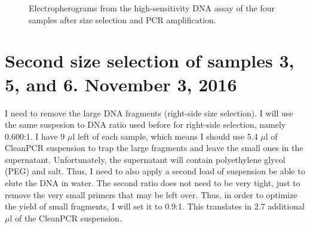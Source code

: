 \documentclass[a4paper,12pt]{article}
\begin{document}
\begin{figure}
\caption{Electropherograms from the high-sensitivity DNA assay of the four samples after size selection and PCR amplification.}\label{fig:sizeselection}
\end{figure}


\section{Second size selection of samples 3, 5, and 6. November 3, 2016}
I need to remove the large DNA fragments (right-side size selection). I will use the same suspesion to DNA ratio used before for right-side selection, namely 0.600:1. I have 9 $\mu$l left of each sample, which means I should use 5.4 $\mu$l of CleanPCR suspension to trap the large fragments and leave the small ones in the supernatant. Unfortunately, the supernatant will contain polyethylene glycol (PEG) and salt. Thus, I need to also apply a second load of suspension be able to elute the DNA in water. The second ratio does not need to be very tight, just to remove the very small primers that may be left over. Thus, in order to optimize the yield of small fragments, I will set it to 0.9:1. This translates in 2.7 additional $\mu$l of the CleanPCR suspension.
\end{document}
